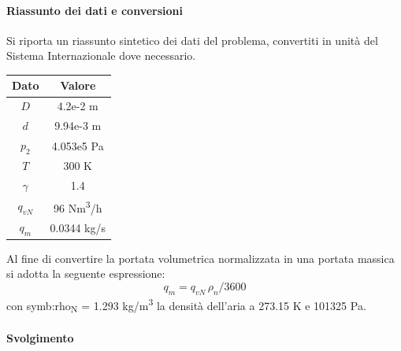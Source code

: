 \paragraph{Riassunto dei dati e conversioni}
Si riporta un riassunto sintetico dei dati del problema, convertiti in unità del Sistema Internazionale dove necessario.
\begin{table}[H]
	\centering
	\begin{tabular}{c|c}
			\toprule
			\toprule
			\textbf{Dato} & \textbf{Valore} \\
			\midrule
			\midrule
			$D$ & 4.2e-2 m \\
			\midrule
			$d$ & 9.94e-3 m \\
			\midrule
			$p_2$ & 4.053e5 Pa\\
			\midrule
			$T$ & 300 K\\
			\midrule
			$\gamma$ & 1.4 \\
			\midrule
			$q_{\textit{vN}}$ & 96 Nm\textsuperscript{3}/h	\\
			\midrule
			$q_m$ & 0.0344 kg/s\\
			\bottomrule
			\bottomrule
	\end{tabular}
\end{table}
Al fine di convertire la portata volumetrica normalizzata in una portata massica si adotta la seguente espressione: 
\begin{equation}
	q_m = q_{\textit{vN}}\, \rho_n / 3600 
\end{equation}
con \gls{symb:rho}\textsubscript{N} = 1.293 kg/m\textsuperscript{3} la densità dell'aria a 273.15 K e 101325 Pa.

\paragraph{Svolgimento}